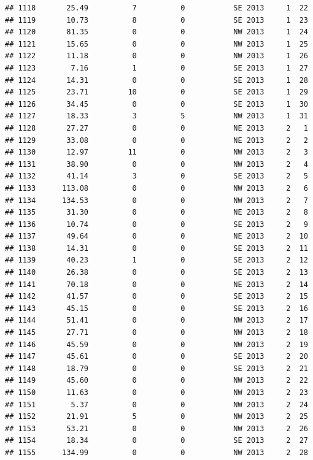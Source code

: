 \documentclass[
]{article}
\begin{document}
\begin{verbatim}
## 1118       25.49          7          0           SE 2013     1  22
## 1119       10.73          8          0           SE 2013     1  23
## 1120       81.35          0          0           NW 2013     1  24
## 1121       15.65          0          0           NW 2013     1  25
## 1122       11.18          0          0           NW 2013     1  26
## 1123        7.16          1          0           SE 2013     1  27
## 1124       14.31          0          0           SE 2013     1  28
## 1125       23.71         10          0           SE 2013     1  29
## 1126       34.45          0          0           SE 2013     1  30
## 1127       18.33          3          5           NW 2013     1  31
## 1128       27.27          0          0           NE 2013     2   1
## 1129       33.08          0          0           NE 2013     2   2
## 1130       12.97         11          0           NW 2013     2   3
## 1131       38.90          0          0           NW 2013     2   4
## 1132       41.14          3          0           SE 2013     2   5
## 1133      113.08          0          0           NW 2013     2   6
## 1134      134.53          0          0           NW 2013     2   7
## 1135       31.30          0          0           NE 2013     2   8
## 1136       10.74          0          0           SE 2013     2   9
## 1137       49.64          0          0           NE 2013     2  10
## 1138       14.31          0          0           SE 2013     2  11
## 1139       40.23          1          0           SE 2013     2  12
## 1140       26.38          0          0           SE 2013     2  13
## 1141       70.18          0          0           NE 2013     2  14
## 1142       41.57          0          0           SE 2013     2  15
## 1143       45.15          0          0           SE 2013     2  16
## 1144       51.41          0          0           NW 2013     2  17
## 1145       27.71          0          0           NW 2013     2  18
## 1146       45.59          0          0           NW 2013     2  19
## 1147       45.61          0          0           SE 2013     2  20
## 1148       18.79          0          0           SE 2013     2  21
## 1149       45.60          0          0           NW 2013     2  22
## 1150       11.63          0          0           NW 2013     2  23
## 1151        5.37          0          0           NW 2013     2  24
## 1152       21.91          5          0           NW 2013     2  25
## 1153       53.21          0          0           NW 2013     2  26
## 1154       18.34          0          0           SE 2013     2  27
## 1155      134.99          0          0           NW 2013     2  28

\end{verbatim}
\end{document}
